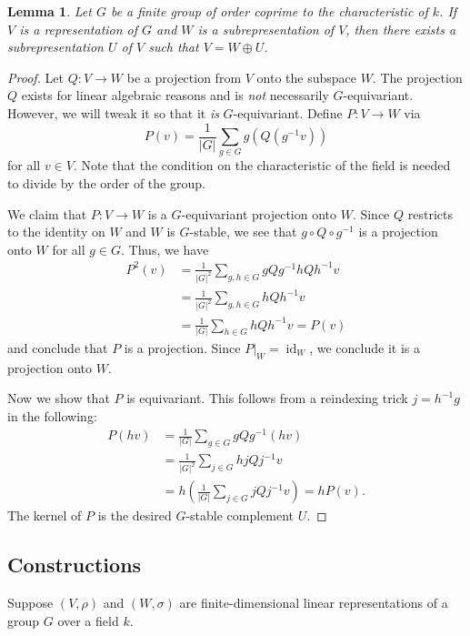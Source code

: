 \documentclass[12pt]{article}
\theoremstyle{plain}
\newtheorem{lemma}[theorem]{Lemma}
\theoremstyle{definition}
\theoremstyle{remark}
\numberwithin{equation}{section}
\begin{document}
\begin{lemma}
Let $G$ be a finite group of order coprime to the characteristic of $k$.
If $V$ is a representation of $G$ and $W$ is a subrepresentation of $V$,
then there exists a subrepresentation $U$ of $V$
such that $V= W \oplus U$.
\end{lemma}

\begin{proof}
Let $Q: V \to W$ be a projection from $V$ onto the subspace $W$.
The projection $Q$ exists for linear algebraic reasons
and is \emph{not} necessarily $G$-equivariant.
However, we will tweak it so that it \emph{is} $G$-equivariant.
Define $P : V \to W$ via
\[
P(v) = \frac{1}{|G|} \sum_{g \in G} g\left( Q\left( g^{-1} v\right)\right)
\]
for all $v \in V$.  Note that the condition on the characteristic of the
field is needed to divide by the order of the group.

We claim that $P : V \to W$ is a $G$-equivariant projection onto $W$.
Since $Q$ restricts to the identity on $W$ and $W$ is $G$-stable,
we see that
$g \circ Q \circ g^{-1}$ is a projection onto $W$
for all $g \in G$.  Thus, we have
\begin{align*}
P^2(v) &=
\frac{1}{|G|^2} \sum_{g,h \in G} gQg^{-1} hQh^{-1}v\\
&=\frac{1}{|G|^2} \sum_{g,h \in G} hQh^{-1}v\\
&=\frac{1}{|G|} \sum_{h \in G} hQh^{-1}v = P(v)
\end{align*}
and conclude that $P$ is a projection.  Since
$P|_W=\operatorname{id}_W$, we conclude it is a projection onto $W$.

Now we show that $P$ is equivariant.
This follows from a reindexing trick $j=h^{-1}g$ in the following:
\begin{align*}
P(hv) &=
\frac{1}{|G|} \sum_{g \in G} gQg^{-1} (hv)\\
&=\frac{1}{|G|^2} \sum_{j \in G} hjQj^{-1}v\\
&=h\left(\frac{1}{|G|} \sum_{j \in G} jQj^{-1}v\right) = hP(v).
\end{align*}
The kernel of $P$ is the desired $G$-stable complement $U$.
\end{proof}

\subsection{Constructions}

Suppose $(V,\rho)$ and $(W,\sigma)$ are finite-dimensional linear
representations of a group $G$ over a field $k$.
\end{document}
